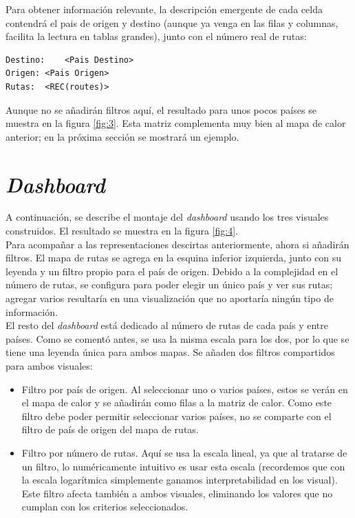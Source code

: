 \documentclass[11pt]{opticajnl}
\begin{document}
Para obtener información relevante, la descripción emergente de cada celda contendrá el pais de origen y destino (aunque ya venga en las filas y columnas, facilita la lectura en tablas grandes), junto con el número real de rutas:

\begin{lstlisting}[style=terminal]
Destino:	<Pais Destino>
Origen:	<Pais Origen>
Rutas:	<REC(routes)>
\end{lstlisting}

Aunque no se añadirán filtros aquí, el resultado para unos pocos países se muestra en la figura \ref{fig:3}. Esta matriz complementa muy bien al mapa de calor anterior; en la próxima sección se mostrará un ejemplo.




\section{\textit{Dashboard}}

A continuación, se describe el montaje del \textit{dashboard} usando los tres visuales construidos. El resultado se muestra en la figura \ref{fig:4}. \\

Para acompañar a las representaciones descirtas anteriormente, ahora si añadirán filtros. El mapa de rutas se agrega en la esquina inferior izquierda, junto con su leyenda y un filtro propio para el país de origen. Debido a la complejidad en el número de rutas, se configura para poder elegir un único país y ver sus rutas; agregar varios resultaría en una visualización que no aportaría ningún tipo de información. \\

El resto del \textit{dashboard} está dedicado al número de rutas de cada país y entre países. Como se comentó antes, se usa la misma escala para los dos, por lo que se tiene una leyenda única para ambos mapas. Se añaden dos filtros compartidos para ambos visuales: 
\begin{itemize}
\item Filtro por país de origen. Al seleccionar uno o varios países, estos se verán en el mapa de calor y se añadirán como filas a la matriz de calor. Como este filtro debe poder permitir seleccionar varios países, no se comparte con el filtro de país de origen del mapa de rutas. 
\item Filtro por número de rutas. Aquí se usa la escala lineal, ya que al tratarse de un filtro, lo numéricamente intuitivo es usar esta escala (recordemos que con la escala logarítmica simplemente ganamos interpretabilidad en los visual). Este filtro afecta también a ambos visuales, eliminando los valores que no cumplan con los criterios seleccionados.
\end{itemize}
\end{document}
